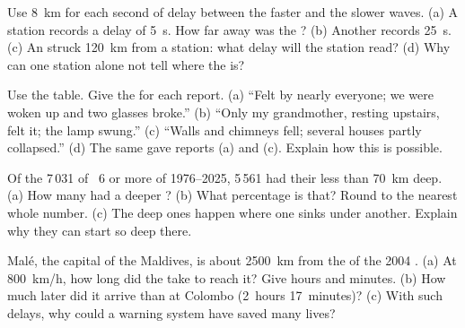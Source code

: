 \begin{exercise}[$\star\star$]\label{exo:g7:earthquakes:7}
Use \qty{8}{km} for each second of delay between the faster and the
slower waves. (a) A station records a delay of \qty{5}{s}. How far away
was the ? (b) Another records \qty{25}{s}. (c) An 
struck \qty{120}{km} from a station: what delay will the station read?
(d) Why can one station alone not tell where the  is?
\end{exercise}

\begin{exercise}[$\star\star$]\label{exo:g7:earthquakes:8}
Use the  table. Give the  for each report. (a) ``Felt
by nearly everyone; we were woken up and two glasses broke.'' (b) ``Only
my grandmother, resting upstairs, felt it; the lamp swung.'' (c) ``Walls
and chimneys fell; several houses partly collapsed.'' (d) The same
 gave reports (a) and (c). Explain how this is possible.
\end{exercise}

\begin{exercise}[$\star\star$]\label{exo:g7:earthquakes:9}
Of the 7\,031  of ~6 or more of 1976--2025, 5\,561 had
their  less than \qty{70}{km} deep. (a) How many had a deeper ?
(b) What percentage is that? Round to the nearest whole number. (c) The
deep ones happen where one  sinks under another. Explain why they can
start so deep there.
\end{exercise}

\begin{exercise}[$\star\star$]\label{exo:g7:earthquakes:10}
Malé, the capital of the Maldives, is about \qty{2500}{km} from the
 of the 2004 . (a) At \qty{800}{km/h}, how long did the
 take to reach it? Give hours and minutes. (b) How much later did
it arrive than at Colombo (2~hours 17~minutes)? (c) With such delays, why
could a warning system have saved many lives?
\end{exercise}

